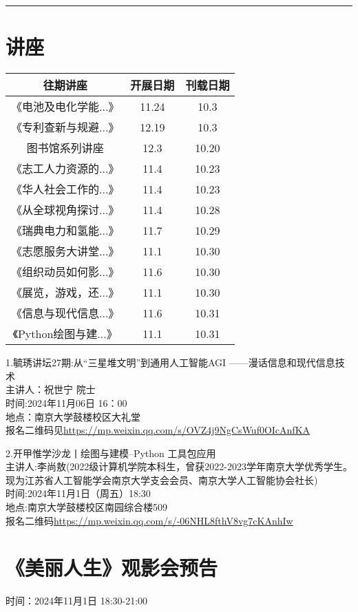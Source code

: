 \documentclass[letterpaper, 12pt]{article}
\begin{document}
\hrule
\pagebreak
\begin{multicols}{2}

\section{讲座}
\begin{tabular}{|c|c|c|}
    \hline
    往期讲座 & 开展日期 & 刊载日期\\
    \hline\hline
    《电池及电化学能...》 & 11.24 & 10.3\\
    《专利查新与规避...》 & 12.19 & 10.3\\
    图书馆系列讲座 & 12.3 & 10.20\\
    《志工人力资源的...》 & 11.4 & 10.23\\
    《华人社会工作的...》 & 11.4 & 10.23\\
    《从全球视角探讨...》 & 11.4 & 10.28\\
    《瑞典电力和氢能...》 & 11.7 & 10.29\\
    《志愿服务大讲堂...》 & 11.1 & 10.30\\
    《组织动员如何影...》 & 11.6 & 10.30\\
    《展览，游戏，还...》 & 11.1 & 10.30\\
    《信息与现代信息...》 & 11.6 & 10.31\\
    《Python绘图与建...》 & 11.1 & 10.31\\
    \hline
\end{tabular}

1.毓琇讲坛27期:从“三星堆文明”到通用人工智能AGI ——漫话信息和现代信息技术\\
主讲人：祝世宁 院士\\
时间:2024年11月06日 16：00\\
地点：南京大学鼓楼校区大礼堂\\
报名二维码见\url{https://mp.weixin.qq.com/s/OVZ4j9NgCsWuf0OIcAnfKA}

2.开甲惟学沙龙丨绘图与建模--Python 工具包应用\\
主讲人:李尚敖(2022级计算机学院本科生，曾获2022-2023学年南京大学优秀学生。现为江苏省人工智能学会南京大学支会会员、南京大学人工智能协会社长)\\
时间:2024年11月1日（周五）18:30\\
地点:南京大学鼓楼校区南园综合楼509\\
报名二维码\url{https://mp.weixin.qq.com/s/-06NHL8fthV8vg7cKAnhIw}
\section{《美丽人生》观影会预告}
时间：2024年11月1日 18:30-21:00


\end{multicols}
\end{document}
